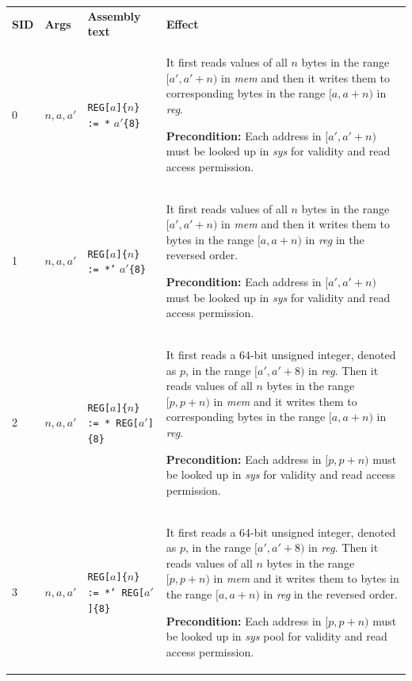 \documentclass[10pt,twocolumn]{article}
\begin{document}
\begin{table}[!h]
\begin{center}
\def\arraystretch{1.5}
\begin{tabular}{lp{1.2cm}p{5.5cm}p{7.5cm}}
\textbf{SID} & \textbf{Args} & \textbf{Assembly text} & \textbf{Effect}
\\

0 & $ n,a,a' $ %
& \texttt{REG[}$ a $\texttt{]\{}$ n $\texttt{\} := *} $ a'
$\texttt{\{8\}} %
& It first reads values of all $ n $ bytes in the range $ [a',a'+n) $ in
\textit{mem} and then it writes them to corresponding bytes in the range $
[a,a+n) $ in \textit{reg}.

\textbf{Precondition:} Each address in $ [a',a'+n) $ must be looked up in
\textit{sys} for validity and read access permission. \\

1 & $ n,a,a' $ %
& \texttt{REG[}$ a $\texttt{]\{}$ n $\texttt{\} := *'} $ a'
$\texttt{\{8\}} %
& It first reads values of all $ n $ bytes in the range $ [a',a'+n) $ in
\textit{mem} and then it writes them to bytes in the range $ [a,a+n) $ in
\textit{reg} in the reversed order.

\textbf{Precondition:} Each address in $ [a',a'+n) $ must be looked up in
\textit{sys} for validity and read access permission. \\

2 & $ n,a,a' $ %
& \texttt{REG[}$ a $\texttt{]\{}$ n $\texttt{\} := * REG[}$ a'
$\texttt{]\{8\}} %
& It first reads a $ 64 $-bit unsigned integer, denoted as $ p $, in the range $
[a',a'+8) $ in \textit{reg}. Then it reads values of all $ n $ bytes in the
range $ [p,p+n) $ in \textit{mem} and it writes them to corresponding bytes in
the range $ [a,a+n) $ in \textit{reg}.

\textbf{Precondition:} Each address in $ [p,p+n) $ must be looked up in
\textit{sys} for validity and read access permission. \\

3 & $ n,a,a' $ %
& \texttt{REG[}$ a $\texttt{]\{}$ n $\texttt{\} := *' REG[}$ a'
$\texttt{]\{8\}} %
& It first reads a 64-bit unsigned integer, denoted as $ p $, in the range $
[a',a'+8) $ in \textit{reg}. Then it reads values of all $ n $ bytes in the
range $ [p,p+n) $ in \textit{mem} and it writes them to bytes in the range $
[a,a+n) $ in \textit{reg} in the reversed order.

\textbf{Precondition:} Each address in $ [p,p+n) $ must be looked up in
\textit{sys} pool for validity and read access permission. \\


\end{tabular}
\end{center}
\end{table}
\end{document}
